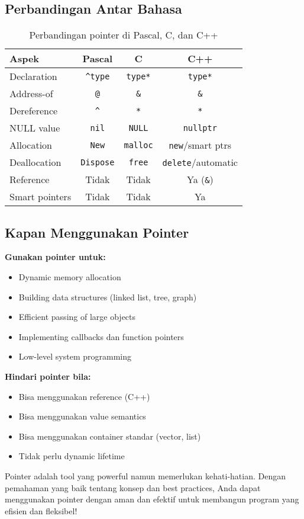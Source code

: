 \documentclass[../main.tex]{subfiles}
\begin{document}
\subsection{Perbandingan Antar Bahasa}

\begin{table}[H]
\centering
\begin{tabular}{|l|c|c|c|}
\hline
\textbf{Aspek} & \textbf{Pascal} & \textbf{C} & \textbf{C++} \\
\hline
Declaration & \texttt{\^{}type} & \texttt{type*} & \texttt{type*} \\
\hline
Address-of & \texttt{@} & \texttt{\&} & \texttt{\&} \\
\hline
Dereference & \texttt{\^{}} & \texttt{*} & \texttt{*} \\
\hline
NULL value & \texttt{nil} & \texttt{NULL} & \texttt{nullptr} \\
\hline
Allocation & \texttt{New} & \texttt{malloc} & \texttt{new}/smart ptrs \\
\hline
Deallocation & \texttt{Dispose} & \texttt{free} & \texttt{delete}/automatic \\
\hline
Reference & Tidak & Tidak & Ya (\texttt{\&}) \\
\hline
Smart pointers & Tidak & Tidak & Ya \\
\hline
\end{tabular}
\caption{Perbandingan pointer di Pascal, C, dan C++}
\end{table}

\subsection{Kapan Menggunakan Pointer}

\textbf{Gunakan pointer untuk:}
\begin{itemize}
  \item Dynamic memory allocation
  \item Building data structures (linked list, tree, graph)
  \item Efficient passing of large objects
  \item Implementing callbacks dan function pointers
  \item Low-level system programming
\end{itemize}

\textbf{Hindari pointer bila:}
\begin{itemize}
  \item Bisa menggunakan reference (C++)
  \item Bisa menggunakan value semantics
  \item Bisa menggunakan container standar (vector, list)
  \item Tidak perlu dynamic lifetime
\end{itemize}

Pointer adalah tool yang powerful namun memerlukan kehati-hatian. Dengan pemahaman yang baik tentang konsep dan best practices, Anda dapat menggunakan pointer dengan aman dan efektif untuk membangun program yang efisien dan fleksibel!
\end{document}
